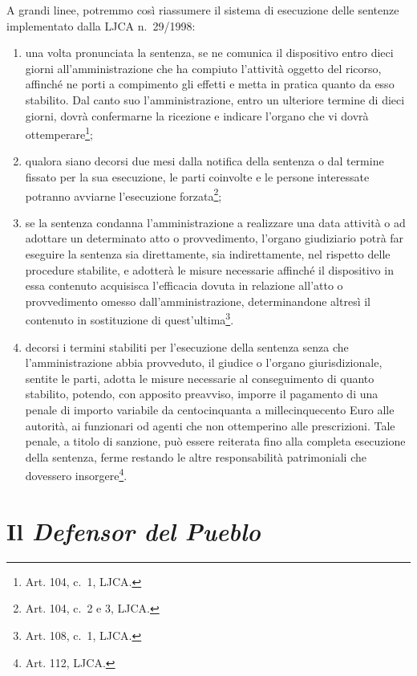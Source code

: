 \documentclass[12pt,it,a4paper,]{report}
\begin{document}
A grandi linee, potremmo così riassumere il sistema di esecuzione delle
sentenze implementato dalla LJCA n.~29/1998:

\begin{enumerate}
\def\labelenumi{\alph{enumi})}
\item
  una volta pronunciata la sentenza, se ne comunica il dispositivo entro
  dieci giorni all'amministrazione che ha compiuto l'attività oggetto
  del ricorso, affinché ne porti a compimento gli effetti e metta in
  pratica quanto da esso stabilito. Dal canto suo l'amministrazione,
  entro un ulteriore termine di dieci giorni, dovrà confermarne la
  ricezione e indicare l'organo che vi dovrà ottemperare\footnote{Art.
    104, c.~1, LJCA.};
\item
  qualora siano decorsi due mesi dalla notifica della sentenza o dal
  termine fissato per la sua esecuzione, le parti coinvolte e le persone
  interessate potranno avviarne l'esecuzione forzata\footnote{Art. 104,
    c.~2 e 3, LJCA.};
\item
  se la sentenza condanna l'amministrazione a realizzare una data
  attività o ad adottare un determinato atto o provvedimento, l'organo
  giudiziario potrà far eseguire la sentenza sia direttamente, sia
  indirettamente, nel rispetto delle procedure stabilite, e adotterà le
  misure necessarie affinché il dispositivo in essa contenuto acquisisca
  l'efficacia dovuta in relazione all'atto o provvedimento omesso
  dall'amministrazione, determinandone altresì il contenuto in
  sostituzione di quest'ultima\footnote{Art. 108, c.~1, LJCA.}.
\item
  decorsi i termini stabiliti per l'esecuzione della sentenza senza che
  l'amministrazione abbia provveduto, il giudice o l'organo
  giurisdizionale, sentite le parti, adotta le misure necessarie al
  conseguimento di quanto stabilito, potendo, con apposito preavviso,
  imporre il pagamento di una penale di importo variabile da
  centocinquanta a millecinquecento Euro alle autorità, ai funzionari od
  agenti che non ottemperino alle prescrizioni. Tale penale, a titolo di
  sanzione, può essere reiterata fino alla completa esecuzione della
  sentenza, ferme restando le altre responsabilità patrimoniali che
  dovessero insorgere\footnote{Art. 112, LJCA.}.
\end{enumerate}

\hypertarget{il-defensor-del-pueblo}{%
\section{\texorpdfstring{Il \emph{Defensor del
Pueblo}}{Il Defensor del Pueblo}}\label{il-defensor-del-pueblo}}
\end{document}
